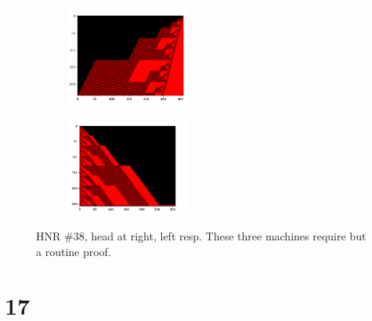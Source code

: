 \documentclass[12pt]{article}
\begin{document}
\begin{figure}[H]
\centering
\begin{subfigure}
\centering
\includegraphics[width=0.45\textwidth]{38-r.png}
\label{fig:38r}
\end{subfigure}
\hfill
\begin{subfigure}
\centering
\includegraphics[width=0.45\textwidth]{38.png}
\label{fig:38l}
\end{subfigure}
\caption{HNR \#38, head at right, left resp. These three machines require but a routine proof.}
\end{figure}




\newpage
{}
\section*{17}
\end{document}
